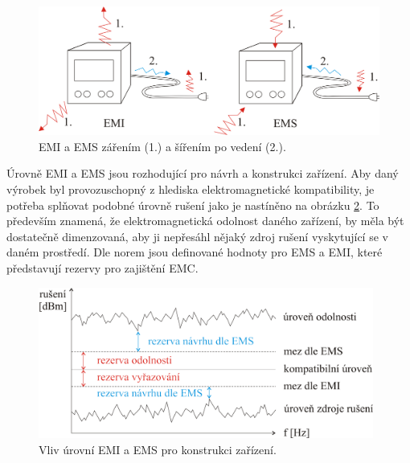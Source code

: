 \begin{figure}[!h]
	\centering
	\includegraphics[width=11.5cm]{emc_emi_ems.png}
	\caption{EMI a EMS zářením (1.) a šířením po vedení (2.).}
	\label{obr:emc_emi_ems}
\end{figure}

Úrovně EMI a EMS jsou rozhodující pro návrh a konstrukci zařízení. Aby daný výrobek byl provozuschopný z hlediska elektromagnetické kompatibility, je potřeba splňovat podobné úrovně rušení jako je nastíněno na obrázku \ref{obr:emc_meze}. To především znamená, že elektromagnetická odolnost daného zařízení, by měla být dostatečně dimenzovaná, aby ji nepřesáhl nějaký zdroj rušení vyskytující se v daném prostředí. Dle norem jsou definované hodnoty pro EMS a EMI, které představují rezervy pro zajištění EMC.
\begin{figure}[!h]
	\centering
	\includegraphics[width=11cm]{emc_meze.png}
	\caption{Vliv úrovní EMI a EMS pro konstrukci zařízení.}
	\label{obr:emc_meze}
\end{figure}

